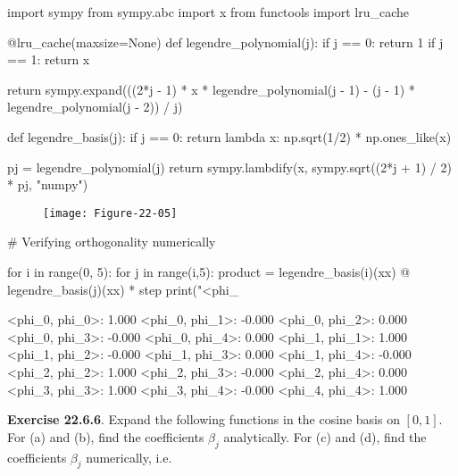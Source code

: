 \begin{python}
import sympy
from sympy.abc import x
from functools import lru_cache

@lru_cache(maxsize=None)
def legendre_polynomial(j):
    if j == 0:
        return 1
    if j == 1:
        return x
    
    return sympy.expand(((2*j - 1) * x * legendre_polynomial(j - 1) - (j - 1) * legendre_polynomial(j - 2)) / j)

def legendre_basis(j):
    if j == 0:
        return lambda x: np.sqrt(1/2) * np.ones_like(x)
    
    pj = legendre_polynomial(j)
    return sympy.lambdify(x, sympy.sqrt((2*j + 1) / 2) * pj, "numpy")
\end{python}


\begin{figure}[H]
\texttt{[image: Figure-22-05]}
\end{figure}

\begin{python}
# Verifying orthogonality numerically

for i in range(0, 5):
    for j in range(i,5):
        product = legendre_basis(i)(xx) @ legendre_basis(j)(xx) * step
        print("<phi_%
\end{python}

\begin{console}
<phi\_0, phi\_0>: 1.000
<phi\_0, phi\_1>: -0.000
<phi\_0, phi\_2>: 0.000
<phi\_0, phi\_3>: -0.000
<phi\_0, phi\_4>: 0.000
<phi\_1, phi\_1>: 1.000
<phi\_1, phi\_2>: -0.000
<phi\_1, phi\_3>: 0.000
<phi\_1, phi\_4>: -0.000
<phi\_2, phi\_2>: 1.000
<phi\_2, phi\_3>: -0.000
<phi\_2, phi\_4>: 0.000
<phi\_3, phi\_3>: 1.000
<phi\_3, phi\_4>: -0.000
<phi\_4, phi\_4>: 1.000
\end{console}

\textbf{Exercise 22.6.6}. Expand the following functions in the cosine
basis on \([0, 1]\). For (a) and (b), find the coefficients \(\beta_j\)
analytically. For (c) and (d), find the coefficients \(\beta_j\)
numerically, i.e.

